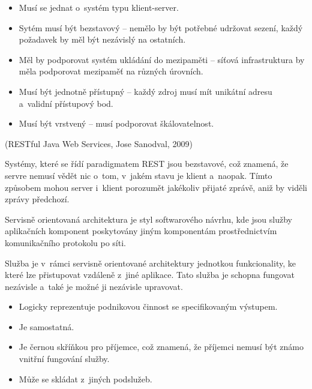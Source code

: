 \documentclass[12pt]{article}
\begin{document}
\begin{itemize}
\item Musí se jednat o~systém typu klient-server.
\item Sytém musí být bezstavový -- nemělo by být potřebné udržovat sezení, každý požadavek by měl být nezávislý na ostatních.
\item Měl by podporovat systém ukládání do mezipaměti -- síťová infrastruktura by měla podporovat mezipaměť na různých úrovních.
\item Musí být jednotně přístupný -- každý zdroj musí mít unikátní adresu a~validní přístupový bod.
\item Musí být vrstvený -- musí podporovat škálovatelnost.
\end{itemize}

(RESTful Java Web Services, Jose Sanodval, 2009)


Systémy, které se řídí paradigmatem REST jsou bezstavové, což znamená,
že servre nemusí vědět nic o~tom, v~jakém stavu je klient a~naopak.
Tímto způsobem mohou server i~klient porozumět  jakékoliv přijaté zprávě,
aniž by viděli zprávy předchozí.


Servisně orientovaná architektura je styl softwarového návrhu, 
kde jsou služby aplikačních komponent poskytovány jiným komponentám
prostřednictvím komunikačního protokolu po síti.

Služba je v~rámci servisně orientované architektury jednotkou funkcionality, 
ke které lze přistupovat vzdáleně z~jiné aplikace.
Tato služba je schopna fungovat nezávisle a~také je možné ji nezávisle upravovat.

\bigskip


\begin{itemize}

\item Logicky reprezentuje podnikovou činnost se specifikovaným výstupem.

\item Je samostatná.

\item Je černou skříňkou pro příjemce, což znamená,
      že příjemci nemusí být známo vnitřní fungování služby.
      
\item Může se skládat z~jiných podslužeb.

\end{itemize}
\end{document}
